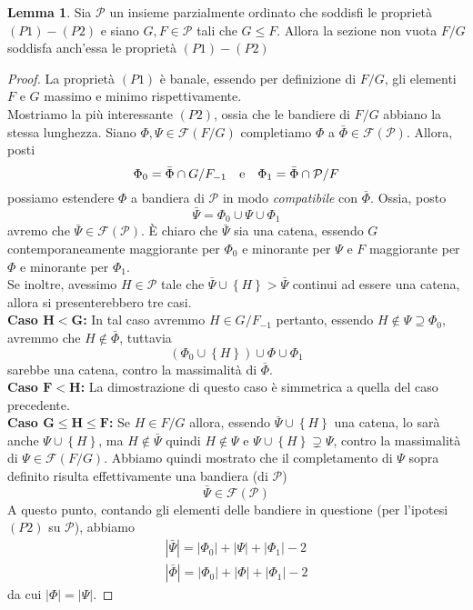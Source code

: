 \documentclass[a4paper,12pt]{report}
\newcommand{\p}{\mathcal{P}}
\theoremstyle{plain}
\theoremstyle{definition}
\newtheorem{lem}[teo]{Lemma}
\begin{document}
\begin{lem}
\label{P1P2Sections}
Sia $\p$ un insieme parzialmente ordinato che soddisfi le propriet\`a $(P1)-(P2)$ e siano $G,F\in\p$ tali che $G\leq F$. Allora la sezione non vuota
$F/G$ soddisfa anch'essa le propriet\`a $(P1)-(P2)$
\end{lem}
\begin{proof}
La propriet\`a $(P1)$ \`e banale, essendo per definizione di $F/G$, gli elementi $F$ e $G$ massimo e minimo rispettivamente.\\
Mostriamo la pi\`u interessante $(P2)$, ossia che le bandiere di $F/G$ abbiano la stessa lunghezza. Siano $\Phi,\Psi\in\mathcal{F}(F/G)$
completiamo $\Phi$ a $\bar{\Phi}\in\mathcal{F}(\p)$. Allora, posti
\begin{equation*}
\Phi_0=\bar{\Phi}\cap G/F_{-1}\text{\quad e\quad }\Phi_1=\bar{\Phi}\cap\p/F
\end{equation*}
possiamo estendere $\Phi$ a bandiera di $\p$ in modo \emph{compatibile} con $\bar{\Phi}$. Ossia, posto
\begin{equation*}
\bar{\Psi}=\Phi_0\cup\Psi\cup\Phi_1
\end{equation*}
avremo che $\bar{\Psi}\in\mathcal{F}(\p)$. \`E chiaro che $\bar{\Psi}$ sia una catena, essendo $G$ contemporaneamente maggiorante per $\Phi_0$ e
minorante per $\Psi$ e $F$ maggiorante per $\Phi$ e minorante per $\Phi_1$.\\
Se inoltre, avessimo $H\in\p$ tale che $\bar{\Psi}\cup\left\{H\right\}>\bar{\Psi}$ continui ad essere una catena, allora si presenterebbero tre casi.\\
\textbf{Caso $\bm{H<G}$:}
In tal caso avremmo $H\in G/F_{-1}$ pertanto, essendo $H\notin\Psi\supseteq\Phi_0$, avremmo che $H\notin\bar{\Phi}$, tuttavia
\begin{equation*}
\left(\Phi_0\cup\left\{H\right\}\right)\cup\Phi\cup\Phi_1
\end{equation*}
sarebbe una catena, contro la massimalit\`a di $\bar{\Phi}$.\\
\textbf{Caso $\bm{F<H}$:}
La dimostrazione di questo caso \`e simmetrica a quella del caso precedente.\\
\textbf{Caso $\bm{G\leq H\leq F}$:}
Se $H\in F/G$ allora, essendo $\bar{\Psi}\cup\left\{H\right\}$ una catena, lo sar\`a anche $\Psi\cup\left\{H\right\}$, ma
$H\notin\bar{\Psi}$ quindi $H\notin\Psi$ e $\Psi\cup\left\{H\right\}\supsetneq\Psi$, contro la massimalit\`a di $\Psi\in\mathcal{F}(F/G)$.
Abbiamo quindi mostrato che il completamento di $\Psi$ sopra definito risulta effettivamente una bandiera (di $\p$)
\begin{equation*}
\bar{\Psi}\in\mathcal{F}(\p)
\end{equation*}
A questo punto, contando gli elementi delle bandiere in questione (per l'ipotesi $(P2)$ su $\p$), abbiamo
\begin{gather*}
\left|\bar{\Psi}\right|=|\Phi_0|+|\Psi|+|\Phi_1|-2\\
|\bar{\Phi}|=|\Phi_0|+|\Phi|+|\Phi_1|-2
\end{gather*}
da cui $|\Phi|=|\Psi|$.
\end{proof}
\end{document}
